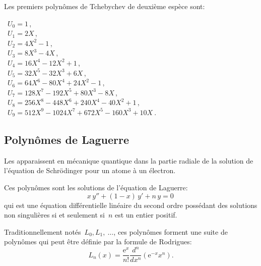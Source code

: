 \medskip
{}
Les premiers polynômes de Tchebychev de deuxième espèce sont:

\noindent
 ~$U_0 = 1 \,$,\\
 ~$U_1 = 2X \,$,\\
 ~$U_2 = 4X^2 - 1 \,$,\\
 ~$U_3 = 8X^3 - 4X \,$,\\
 ~$U_4 = 16X^4 - 12X^2 + 1 \,$,\\
 ~$U_5 = 32X^5 - 32X^3 + 6X \,$,\\
 ~$U_6 = 64X^6 - 80X^4 + 24X^2 - 1 \,$,\\
 ~$U_7 = 128X^7 - 192X^5 + 80X^3 - 8X \,$,\\
 ~$U_8 = 256X^8 - 448 X^6 + 240 X^4 - 40 X^2 + 1 \,$,\\
 ~$U_9 = 512X^9 - 1024 X^7 + 672 X^5 - 160 X^3 + 10 X~.~$



\medskip
\subsection{Polynômes de Laguerre}

Les  apparaissent en mécanique quantique dans la partie radiale 
de la solution de l'équation de Schrödinger 
pour un atome à un électron.

\medskip
Ces polynômes sont les solutions de l'équation de Laguerre:
\begin{equation}
  x\,y'' + (1 - x)\,y' + n\,y = 0\,
\end{equation}
qui est une équation différentielle linéaire du second ordre possédant des solutions non 
singulières si et seulement si~$n$ est un entier positif.

\medskip
Traditionnellement notés~$L_0, L_1,\ \dots$, ces polynômes forment une suite de 
polynômes qui peut être définie par la formule de Rodrigues:
\begin{equation}
  L_n(x)=\frac{\mathrm{e}^x}{n!}\frac{d^n}{dx^n}\left(\mathrm{e}^{-x} x^n\right). 
\end{equation}

